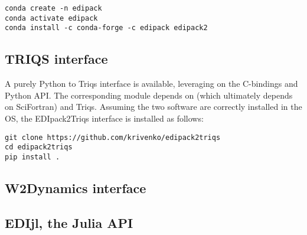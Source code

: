\begin{lstlisting}[style=mybash]
conda create -n edipack
conda activate edipack
conda install -c conda-forge -c edipack edipack2
\end{lstlisting}





\subsection{TRIQS interface}\label{SecEDI2Triqs}
A purely Python \NAME to Triqs interface is available, leveraging on
the C-bindings and Python API. The corresponding module depends on
\NAME (which ultimately depends on SciFortran) and Triqs.
Assuming the two software are correctly installed in the OS, the
EDIpack2Triqs interface is installed as follows:

\begin{lstlisting}[style=mybash]
git clone https://github.com/krivenko/edipack2triqs
cd edipack2triqs
pip install .
\end{lstlisting}



\subsection{W2Dynamics interface}\label{SecEDI2W2Dyn}




\subsection{EDIjl, the Julia API}\label{SecJlAPI}

